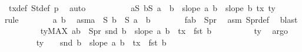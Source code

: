 \begin{isabellebody}
\ tx{\isacharunderscore}{\kern0pt}def\ S{}t{\isacharunderscore}{\kern0pt}def\ p{}\ \isamarkupfalse%
\ auto\isanewline
\ \ \ \ \isanewline
\ \ \ \ \isamarkupfalse%
\ {\isachardoublequoteopen}{\isasymforall}a{\isasymin}S{}{\isachardot}{\kern0pt}\ {\isasymforall}b{\isasymin}S{}{\isachardot}{\kern0pt}\ a\ {\isacharless}{\kern0pt}\ b\ {\isasymlongrightarrow}\ slope\ a\ b\ {\isacharless}{\kern0pt}\ slope\ b\ {\isacharparenleft}{\kern0pt}tx{\isacharcomma}{\kern0pt}\ ty{\isacharparenright}{\kern0pt}{\isachardoublequoteclose}\isanewline
\ \ \ \ \isamarkupfalse%
{\isacharparenleft}{\kern0pt}rule{\isacharplus}{\kern0pt}{\isacharparenright}{\kern0pt}\isanewline
\ \ \ \ \ \ \isamarkupfalse%
\ a\ b\ \isamarkupfalse%
\ asm{\isacharcolon}{\kern0pt}{\isachardoublequoteopen}a\ {\isasymin}\ S{}{\isachardoublequoteclose}\ {\isachardoublequoteopen}b\ {\isasymin}\ S{}{\isachardoublequoteclose}\ {\isachardoublequoteopen}a\ {\isacharless}{\kern0pt}\ b{\isachardoublequoteclose}\isanewline
\ \ \ \ \ \ \isamarkupfalse%
\ f{}{\isacharcolon}{\kern0pt}{\isachardoublequoteopen}{\isacharparenleft}{\kern0pt}a{\isacharcomma}{\kern0pt}b{\isacharparenright}{\kern0pt}\ {\isasymin}\ S{}pr{\isachardoublequoteclose}\ \isamarkupfalse%
\ asm\ S{}pr{\isacharunderscore}{\kern0pt}def\ \isamarkupfalse%
\ blast\isanewline
\ \ \ \ \ \ \ \isamarkupfalse%
\ {\isachardoublequoteopen}ty{\isacharminus}{\kern0pt}{}{\isacharequal}{\kern0pt}{\isacharparenleft}{\kern0pt}MAX\ {\isacharparenleft}{\kern0pt}a{\isacharcomma}{\kern0pt}b{\isacharparenright}{\kern0pt}\ {\isasymin}\ S{}pr{\isachardot}{\kern0pt}\ snd\ b\ {\isacharplus}{\kern0pt}\ {\isacharparenleft}{\kern0pt}slope\ a\ b{\isacharparenright}{\kern0pt}\ {\isacharasterisk}{\kern0pt}\ {\isacharparenleft}{\kern0pt}tx\ {\isacharminus}{\kern0pt}\ fst\ b{\isacharparenright}{\kern0pt}{\isacharparenright}{\kern0pt}{\isachardoublequoteclose}\isanewline
\ \ \ \ \ \ \ \ \isamarkupfalse%
\ ty\ \isamarkupfalse%
\ argo\isanewline
\ \ \ \ \ \ \isamarkupfalse%
\ {\isachardoublequoteopen}ty\ {\isacharminus}{\kern0pt}\ {}\ {\isasymge}\ {\isacharparenleft}{\kern0pt}snd\ b\ {\isacharplus}{\kern0pt}\ {\isacharparenleft}{\kern0pt}slope\ a\ b{\isacharparenright}{\kern0pt}\ {\isacharasterisk}{\kern0pt}\ {\isacharparenleft}{\kern0pt}tx\ {\isacharminus}{\kern0pt}\ fst\ b{\isacharparenright}{\kern0pt}{\isacharparenright}{\kern0pt}{\isachardoublequoteclose}\isanewline

\end{isabellebody}
